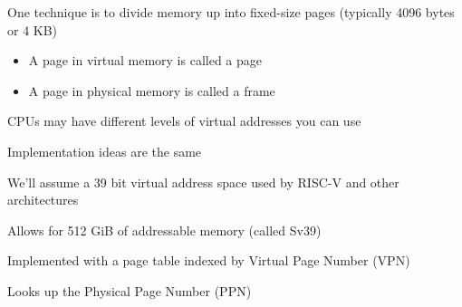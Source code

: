 \begin{slide}


    One technique is to divide memory up into fixed-size pages (typically 4096 bytes or 4 KB)
	\begin{itemize}
		\item A page in virtual memory is called a page
		\item A page in physical memory is called a frame
	\end{itemize}
	
\end{slide}

\begin{slide}


    CPUs may have different levels of virtual addresses you can use

    \leftspace{}Implementation ideas are the same
    \medskip

    We'll assume a 39 bit virtual address space used by RISC-V and other
    architectures

    \leftspace{}Allows for 512 GiB of addressable memory (called Sv39)
    \medskip

    Implemented with a page table indexed by Virtual Page Number (VPN)

    \leftspace{}Looks up the Physical Page Number (PPN)

\end{slide}

